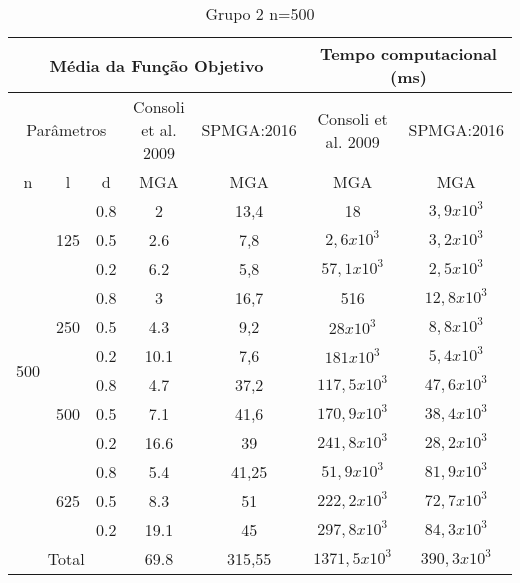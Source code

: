 \documentclass[12pt]{article}
\begin{document}
\begin{table}[]
\centering
\caption{Grupo 2 n=500}
\label{my-label}
\begin{tabular}{|c|c|c|c|c|c|c|}
\hline
\multicolumn{5}{|c|}{Média da Função Objetivo}                                       & \multicolumn{2}{c|}{Tempo computacional (ms)} \\ \hline
\multicolumn{3}{|c|}{Parâmetros}                   & Consoli et al. 2009 & SPMGA:2016 & Consoli et al. 2009        & SPMGA:2016        \\ \hline
n                     & l                    & d   & MGA               & MGA         & MGA                      & MGA                \\ \hline
\multirow{12}{*}{500} & \multirow{3}{*}{125} & 0.8 & 2                 & 13,4        & 18                       & $3,9x10^3$         \\ \cline{3-7} 
                      &                      & 0.5 & 2.6               & 7,8         & $2,6x10^3$               & $3,2x10^3$         \\ \cline{3-7} 
                      &                      & 0.2 & 6.2               & 5,8         & $57,1x10^3$              & $2,5x10^3$         \\ \cline{2-7} 
                      & \multirow{3}{*}{250} & 0.8 & 3                 & 16,7        & 516                      & $12,8x10^3$        \\ \cline{3-7} 
                      &                      & 0.5 & 4.3               & 9,2         & $28x10^3$                & $8,8x10^3$         \\ \cline{3-7} 
                      &                      & 0.2 & 10.1              & 7,6         & $181x10^3$               & $5,4x10^3$         \\ \cline{2-7} 
                      & \multirow{3}{*}{500} & 0.8 & 4.7               & 37,2        & $117,5x10^3$             & $47,6x10^3$        \\ \cline{3-7} 
                      &                      & 0.5 & 7.1               & 41,6        & $170,9x10^3$             & $38,4x10^3$        \\ \cline{3-7} 
                      &                      & 0.2 & 16.6              & 39          & $241,8x10^3$             & $28,2x10^3$        \\ \cline{2-7} 
                      & \multirow{3}{*}{625} & 0.8 & 5.4               & 41,25       & $51,9x10^3$              & $81,9x10^3$        \\ \cline{3-7} 
                      &                      & 0.5 & 8.3               & 51          & $222,2x10^3$             & $72,7x10^3$        \\ \cline{3-7} 
                      &                      & 0.2 & 19.1              & 45          & $297,8x10^3$             & $84,3x10^3$        \\ \hline
\multicolumn{3}{|c|}{Total}                        & 69.8              & 315,55      & $1371,5x10^3$            & $390,3x10^3$       \\ \hline
\end{tabular}
\end{table}
\end{document}
